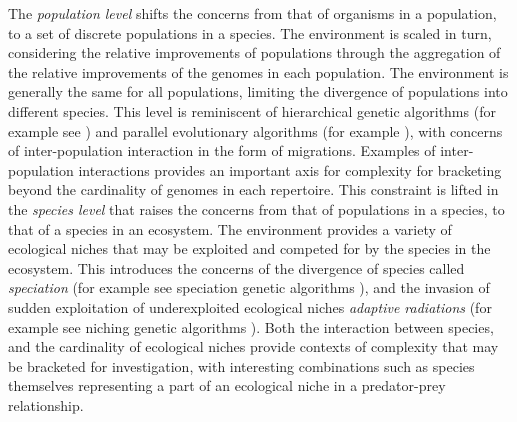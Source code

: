 The \emph{population level} shifts the concerns from that of organisms in a population, to a set of discrete populations in a species. The environment is scaled in turn, considering the relative improvements of populations through the aggregation of the relative improvements of the genomes in each population. The environment is generally the same for all populations, limiting the divergence of populations into different species. This level is reminiscent of hierarchical genetic algorithms (for example see \cite{Pelikan2000, Edwin2004}) and parallel evolutionary algorithms (for example \cite{Cantu-Paz2000}), with concerns of inter-population interaction in the form of migrations. Examples of inter-population interactions provides an important axis for complexity for bracketing beyond the cardinality of genomes in each repertoire.
This constraint is lifted in the \emph{species level} that raises the concerns from that of populations in a species, to that of a species in an ecosystem. The environment provides a variety of ecological niches that may be exploited and competed for by the species in the ecosystem. This introduces the concerns of the divergence of species called \emph{speciation} (for example see speciation genetic algorithms \cite{Deb2000}), and the invasion of sudden exploitation of underexploited ecological niches \emph{adaptive radiations} (for example see niching genetic algorithms \cite{Mahfoud2000}). Both the interaction between species, and the cardinality of ecological niches provide contexts of complexity that may be bracketed for investigation, with interesting combinations such as species themselves representing a part of an ecological niche in a predator-prey relationship.


